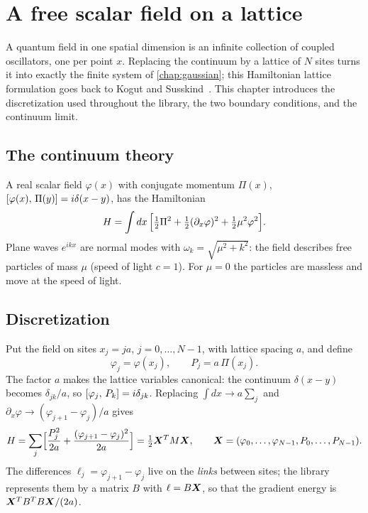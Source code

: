 \chapter{A free scalar field on a lattice}\label{chap:lattice}

A quantum field in one spatial dimension is an infinite collection of coupled oscillators, one per point $x$.
Replacing the continuum by a lattice of $N$ sites turns it into exactly the finite system of
\cref{chap:gaussian}; this Hamiltonian lattice formulation goes back to Kogut and
Susskind~\cite{KogutSusskind1975}. This chapter introduces the discretization used throughout the library, the two boundary
conditions, and the continuum limit.

\section{The continuum theory}
A real scalar field $\varphi(x)$ with conjugate momentum $\Pi(x)$, $[\varphi(x),\,\Pi(y)] = i\delta(x-y)$,
has the Hamiltonian
\begin{equation}\label{eq:H-continuum}
  H = \int dx\, \Bigl[\tfrac12 \Pi^2 + \tfrac12 (\partial_x\varphi)^2 + \tfrac12 \mu^2 \varphi^2\Bigr].
\end{equation}
Plane waves $e^{ikx}$ are normal modes with $\omega_k = \sqrt{\mu^2 + k^2}$: the field describes free particles of
mass $\mu$ (speed of light $c = 1$). For $\mu = 0$ the particles are massless and move at the speed of light.

\section{Discretization}
Put the field on sites $x_j = ja$, $j = 0,\dots,N-1$, with lattice spacing $a$, and define
\begin{equation}
  \varphi_j = \varphi(x_j), \qquad P_j = a\,\Pi(x_j) .
\end{equation}
The factor $a$ makes the lattice variables canonical: the continuum $\delta(x-y)$ becomes $\delta_{jk}/a$, so
$[\varphi_j,\,P_k] = i\delta_{jk}$. Replacing $\int dx \to a\sum_j$ and
$\partial_x\varphi \to (\varphi_{j+1}-\varphi_j)/a$ gives
\begin{equation}\label{eq:H-lattice}
  H = \sum_j \Bigl[\frac{P_j^2}{2a} + \frac{(\varphi_{j+1}-\varphi_j)^2}{2a}\Bigr]
     = \tfrac12 \bm{X}^T M \bm{X}, \qquad \bm{X} = (\varphi_0,\dots,\varphi_{N-1},P_0,\dots,P_{N-1}).
\end{equation}
The differences $\ell_j = \varphi_{j+1} - \varphi_j$ live on the \emph{links} between sites; the library
represents them by a matrix $B$ with $\ell = B\bm{X}$, so that the gradient energy is $\bm{X}^TB^TB\bm{X}/(2a)$.

